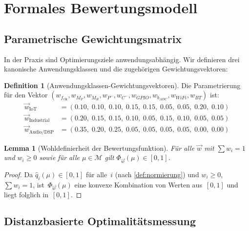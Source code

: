 ﻿\documentclass[12pt, a4paper]{article}
\theoremstyle{plain}
\newtheorem{lemma}[theorem]{Lemma}
\theoremstyle{definition}
\newtheorem{definition}[theorem]{Definition}
\theoremstyle{remark}
\begin{document}
\section{Formales Bewertungsmodell}
\label{sec:bewertungsmodell}

\subsection{Parametrische Gewichtungsmatrix}

In der Praxis sind Optimierungsziele anwendungsabhängig.
Wir definieren drei kanonische Anwendungsklassen und die zugehörigen
Gewichtungsvektoren:

\begin{definition}[Anwendungsklassen-Gewichtungsvektoren]
\label{def:anwendungsklassen}
  Die Parametrierung für den Vektor
  $(w_{f_\text{clk}}, w_{M_F}, w_{M_R}, w_{P^-}, w_{C^-},
    w_{GPIO}, w_{b_{ADC}}, w_{WiFi}, w_{BT})$ ist:
  \begin{align*}
    \vec{w}_\text{IoT}       &= (0.10,\; 0.10,\; 0.10,\; 0.15,\; 0.15,\; 0.05,\; 0.05,\; 0.20,\; 0.10) \\
    \vec{w}_\text{Industrial} &= (0.20,\; 0.15,\; 0.15,\; 0.10,\; 0.05,\; 0.15,\; 0.10,\; 0.05,\; 0.05) \\
    \vec{w}_\text{Audio/DSP}  &= (0.35,\; 0.20,\; 0.25,\; 0.05,\; 0.05,\; 0.05,\; 0.05,\; 0.00,\; 0.00)
  \end{align*}
\end{definition}

\begin{lemma}[Wohldefinierheit der Bewertungsfunktion]
\label{lem:wohldef}
  Für alle $\vec{w}$ mit $\sum w_i = 1$ und $w_i \ge 0$ sowie für alle
  $\mu \in \mathcal{M}$ gilt $\Phi_{\vec{w}}(\mu) \in [0,1]$.
\end{lemma}

\begin{proof}
  Da $\hat{q}_i(\mu) \in [0,1]$ für alle~$i$ (nach \cref{def:normierung})
  und $w_i \ge 0$, $\sum w_i = 1$, ist~$\Phi_{\vec{w}}(\mu)$ eine konvexe
  Kombination von Werten aus~$[0,1]$ und liegt folglich in~$[0,1]$.
 
\end{proof}

\subsection{Distanzbasierte Optimalitätsmessung}
\end{document}
